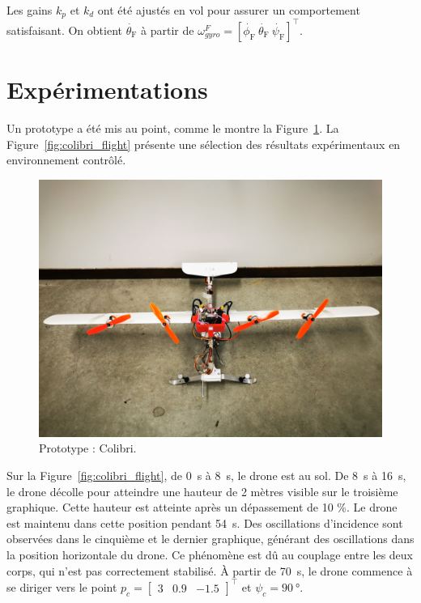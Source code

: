 Les gains $k_{p}$ et $k_{d}$ ont été ajustés en vol pour assurer un comportement satisfaisant. On obtient $\dot{\theta_{\text{F}}}$ à partir de $\omega_{gyro}^{F} = [\dot{\phi_{\text{F}}}~\dot{\theta_{\text{F}}}~\dot{\psi_{\text{F}}}]^\top$.

\section{Expérimentations}
\label{sec:exp}
Un prototype a été mis au point, comme le montre la Figure~\ref{fig:colibri_real}. La Figure~\ref{fig:colibri_flight} présente une sélection des résultats expérimentaux en environnement contrôlé.


\begin{figure}[ht!]
    \centering
    \includegraphics[trim={0 15cm 0 25cm},clip, width=0.6\columnwidth]{figures/colibri_real.jpg}
    \caption{Prototype : Colibri.}
    \label{fig:colibri_real}
\end{figure}

Sur la Figure~\ref{fig:colibri_flight}, de \SI{0}{\second} à \SI{8}{\second}, le drone est au sol. De \SI{8}{\second} à \SI{16}{\second}, le drone décolle pour atteindre une hauteur de 2 mètres visible sur le troisième graphique. Cette hauteur est atteinte après un dépassement de 10 \%. Le drone est maintenu dans cette position pendant \SI{54}{\second}. Des oscillations d'incidence sont observées dans le cinquième et le dernier graphique, générant des oscillations dans la position horizontale du drone. Ce phénomène est dû au couplage entre les deux corps, qui n'est pas correctement stabilisé. À partir de \SI{70}{\second}, le drone commence à se diriger vers le point $p_{c} = \begin{bmatrix} 3 & 0.9 & -1.5 \end{bmatrix}^\top$ et $\psi_{c}=\SI{90}{\degree}$.

